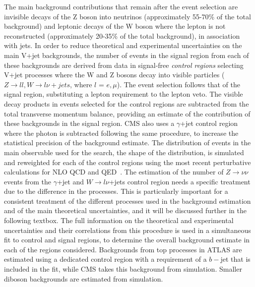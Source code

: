 The main background contributions that remain after the event selection are
invisible decays of the Z boson into neutrinos (approximately 55-70\% of the total background) 
and leptonic decays of the W boson where the lepton is not
reconstructed (approximately 20-35\% of the total background), in association with jets. 
%
In order to reduce theoretical and experimental uncertainties on the main V+jet backgrounds, the number of events in the signal region from each of these backgrounds are derived from data in signal-free \textit{control regions} selecting V+jet processes where the W and Z bosons decay into visible particles ($Z\rightarrow ll, W\rightarrow l\nu+jets$, where $l$ = $e, \mu$). 
The event selection follows that of the signal region, substituting a lepton requirement to the lepton veto. The visible decay products in events selected for the control regions are subtracted from the total transverse momentum balance, providing an estimate of the contribution of these backgrounds in the signal region. CMS also uses a $\gamma$+jet control region where the photon is subtracted following the same procedure, to increase the statistical precision of the background estimate. 
%
The distribution of events in the main observable used for the search, the shape of the \MET distribution, is simulated and reweighted for each of the control regions using the most recent perturbative calculations for NLO QCD and QED~\cite{Lindert:2017olm}. The estimation of the number of $Z\rightarrow \nu\nu$events from the $\gamma$+jet and  $W\rightarrow l\nu$+jets control region needs a specific treatment due to the difference in the processes. This is particularly important for a consistent treatment of the different processes used in the background estimation and of the main theoretical uncertainties, and it will be discussed further in the following textbox. %
The full information on the theoretical and experimental uncertainties and their correlations from this procedure is used in a simultaneous fit to control and signal regions, to determine the overall background estimate in each of the \MET regions considered. 
Backgrounds from top processes in ATLAS are estimated using a dedicated control region with a requirement of a $b-$jet that is included in the fit, while CMS takes this background from simulation. Smaller diboson backgrounds are estimated from simulation. 


